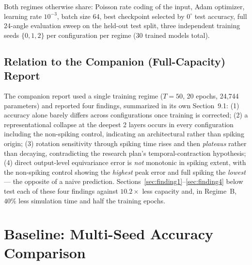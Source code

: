 \documentclass[11pt]{article}
\begin{document}
\noindent Both regimes otherwise share: Poisson rate coding of the input, Adam optimizer, learning
rate $10^{-3}$, batch size 64, best checkpoint selected by $0^\circ$ test accuracy, full 24-angle
evaluation sweep on the held-out test split, three independent training seeds $\{0,1,2\}$ per
configuration per regime (30 trained models total).

\subsection{Relation to the Companion (Full-Capacity) Report}
\label{sec:relation}

The companion report used a single training regime ($T=50$, 20 epochs, 24{,}744 parameters) and
reported four findings, summarized in its own Section~9.1: (1) accuracy alone barely differs across
configurations once training is corrected; (2) a representational collapse at the deepest 2 layers
occurs in every configuration including the non-spiking control, indicating an architectural rather
than spiking origin; (3) rotation sensitivity through spiking time rises and then \emph{plateaus}
rather than decaying, contradicting the research plan's temporal-contraction hypothesis; (4) direct
output-level equivariance error is \emph{not} monotonic in spiking extent, with the non-spiking
control showing the \emph{highest} peak error and full spiking the \emph{lowest} --- the opposite of
a naive prediction. Sections~\ref{sec:finding1}--\ref{sec:finding4} below test each of these four
findings against $10.2\times$ less capacity and, in Regime~B, $40\%$ less simulation time and half
the training epochs.

\section{Baseline: Multi-Seed Accuracy Comparison}
\label{sec:baseline}
\end{document}
